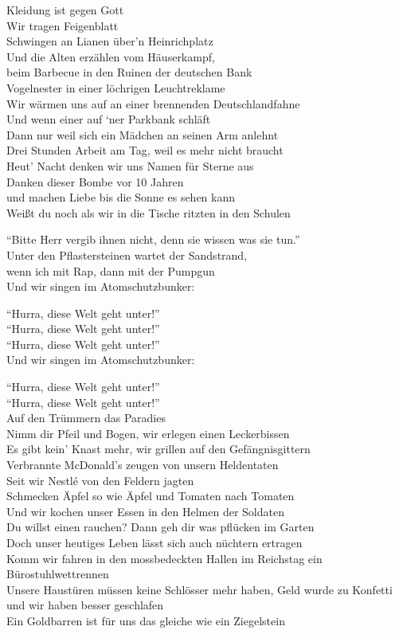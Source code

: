 \documentclass[]{book}
\begin{document}
Kleidung ist gegen Gott\\
Wir tragen Feigenblatt\\
Schwingen an Lianen über'n Heinrichplatz\\
Und die Alten erzählen vom Häuserkampf,\\
beim Barbecue in den Ruinen der deutschen Bank\\
Vogelnester in einer löchrigen Leuchtreklame\\
Wir wärmen uns auf an einer brennenden Deutschlandfahne\\
Und wenn einer auf `ner Parkbank schläft\\
Dann nur weil sich ein Mädchen an seinen Arm anlehnt\\
Drei Stunden Arbeit am Tag, weil es mehr nicht braucht\\
Heut' Nacht denken wir uns Namen für Sterne aus\\
Danken dieser Bombe vor 10 Jahren\\
und machen Liebe bis die Sonne es sehen kann\\
Weißt du noch als wir in die Tische ritzten in den Schulen

``Bitte Herr vergib ihnen nicht, denn sie wissen was sie tun.''\\
Unter den Pflastersteinen wartet der Sandstrand,\\
wenn ich mit Rap, dann mit der Pumpgun\\
Und wir singen im Atomschutzbunker:

``Hurra, diese Welt geht unter!''\\
``Hurra, diese Welt geht unter!''\\
``Hurra, diese Welt geht unter!''\\
Und wir singen im Atomschutzbunker:

``Hurra, diese Welt geht unter!''\\
``Hurra, diese Welt geht unter!''\\
Auf den Trümmern das Paradies\\
Nimm dir Pfeil und Bogen, wir erlegen einen Leckerbissen\\
Es gibt kein' Knast mehr, wir grillen auf den Gefängnisgittern\\
Verbrannte McDonald's zeugen von unsern Heldentaten\\
Seit wir Nestlé von den Feldern jagten\\
Schmecken Äpfel so wie Äpfel und Tomaten nach Tomaten\\
Und wir kochen unser Essen in den Helmen der Soldaten\\
Du willst einen rauchen? Dann geh dir was pflücken im Garten\\
Doch unser heutiges Leben lässt sich auch nüchtern ertragen\\
Komm wir fahren in den mossbedeckten Hallen im Reichstag ein Bürostuhlwettrennen\\
Unsere Haustüren müssen keine Schlösser mehr haben, Geld wurde zu Konfetti und wir haben besser geschlafen\\
Ein Goldbarren ist für uns das gleiche wie ein Ziegelstein
\end{document}
